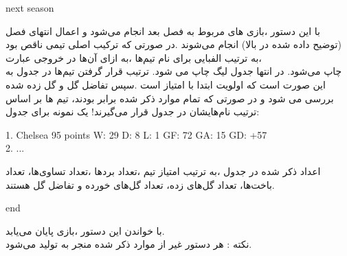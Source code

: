\documentclass[]{article}
\begin{document}
\hrulefill
\begin{tcolorbox}[boxrule=0pt]
	\begin{latin}
		\large{
			next season‬‬‬‬
		}
	\end{latin}
\end{tcolorbox}

ﺑﺎ اﯾﻦ دﺳﺘﻮر ،‬ﺑﺎزی ﻫﺎی ﻣﺮﺑﻮط ﺑﻪ ﻓﺼﻞ ﺑﻌﺪ اﻧﺠﺎم ﻣﯽﺷﻮد و اﻋﻤﺎل اﻧﺘﻬﺎی ﻓﺼﻞ 
(ﺗﻮﺿﯿﺢ داده ﺷﺪه در ﺑﺎﻻ) اﻧﺠﺎم ﻣﯽﺷﻮﻧﺪ .‬در‬‬‬‬ ﺻﻮرﺗﯽ ﮐﻪ ﺗﺮﮐﯿﺐ اﺻﻠﯽ ﺗﯿﻤﯽ ﻧﺎﻗﺺ 
ﺑﻮد ،‬ﺑﻪ ﺗﺮﺗﯿﺐ اﻟﻔﺒﺎﯾﯽ ﺑﺮای ﻧﺎم ﺗﯿﻢﻫﺎ ،‬ﺑﻪ ازای آنﻫﺎ در ﺧﺮوﺟﯽ ﻋﺒﺎرت\\ 
‬ﭼﺎپ ﻣﯽﺷﻮد. ‬در اﻧﺘﻬﺎ ﺟﺪول ﻟﯿﮓ ﭼﺎپ ﻣﯽ ﺷﻮد. ‬ﺗﺮﺗﯿﺐ ﻗﺮار ﮔﺮﻓﺘﻦ ﺗﯿﻢﻫﺎ در ﺟﺪول 
ﺑﻪ اﯾﻦ ﺻﻮرت اﺳﺖ ﮐﻪ‬‬‬‬‬ اوﻟﻮﯾﺖ اﺑﺘﺪا ﺑﺎ اﻣﺘﯿﺎز اﺳﺖ .‬ﺳﭙﺲ ﺗﻔﺎﺿﻞ ﮔﻞ و ﮔﻞ زده 
ﺷﺪه 
ﺑﺮرﺳﯽ ﻣﯽ ﺷﻮد و در ﺻﻮرﺗﯽ ﮐﻪ ﺗﻤﺎم ﻣﻮارد ذﮐﺮ ﺷﺪه ﺑﺮاﺑﺮ ﺑﻮدﻧﺪ،‬‬‬‬‬ ﺗﯿﻢ ﻫﺎ ﺑﺮ 
اﺳﺎس ﺗﺮﺗﯿﺐ ﻧﺎمﻫﺎﯾﺸﺎن در ﺟﺪول ﻗﺮار ﻣﯽﮔﯿﺮﻧﺪ!‬‬
ﯾﮏ ﻧﻤﻮﻧﻪ ﺑﺮای ﺟﺪول:‬‬‬‬
\begin{tcolorbox}[boxrule=0pt]
	\begin{latin}
		\large{
			1. Chelsea 95 points W: 29 D: 8 L: 1 GF: 72 GA: 15 GD: +57‬‬‬‬
			\\
			2. ...
		}
	\end{latin}
\end{tcolorbox}

اﻋﺪاد ذﮐﺮ ﺷﺪه در ﺟﺪول ،‬ﺑﻪ ﺗﺮﺗﯿﺐ اﻣﺘﯿﺎز ﺗﯿﻢ ،‬ﺗﻌﺪاد ﺑﺮدﻫﺎ ،‬ﺗﻌﺪاد ﺗﺴﺎویﻫﺎ، 
‬ﺗﻌﺪاد ﺑﺎﺧﺖﻫﺎ، ‬ﺗﻌﺪاد ﮔﻞﻫﺎی زده، ‬ﺗﻌﺪاد ﮔﻞﻫﺎی‬‬‬‬‬‬‬‬ ﺧﻮرده و ﺗﻔﺎﺿﻞ ﮔﻞ ﻫﺴﺘﻨﺪ.‬‬‬‬



\begin{tcolorbox}[boxrule=0pt]
	\begin{latin}
		\large{
			end
		}
	\end{latin}
\end{tcolorbox}
ﺑﺎ ﺧﻮاﻧﺪن اﯾﻦ دﺳﺘﻮر ،‬ﺑﺎزی ﭘﺎﯾﺎن ﻣﯽﯾﺎﺑﺪ.‬‬‬‬‬
\\ﻧﮑﺘﻪ : ‬ﻫﺮ دﺳﺘﻮر ﻏﯿﺮ از ﻣﻮارد ذﮐﺮ ﺷﺪه ﻣﻨﺠﺮ ﺑﻪ ﺗﻮﻟﯿﺪ  
‬ﻣﯽﺷﻮد.‬‬‬‬‬‬
\end{document}
